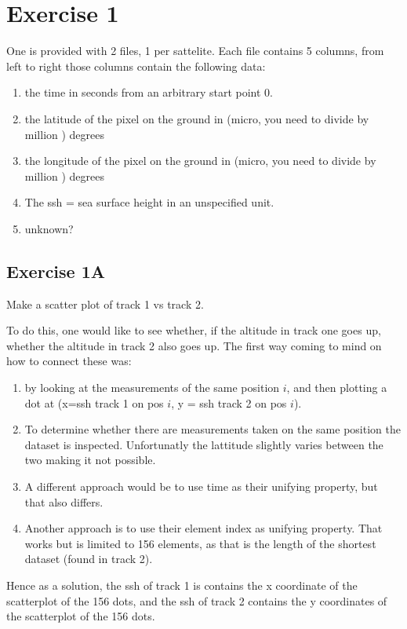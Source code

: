 \section{Exercise 1}\label{sec:exercises}
One is provided with 2 files, 1 per sattelite. Each file contains 5 columns, from left to right those columns contain the following data:
\begin{enumerate}
    \item the time in seconds from an arbitrary start point 0.
    \item the latitude of the pixel on the ground in (micro, you need to divide by million ) degrees
    \item the longitude of the pixel on the ground in (micro, you need to divide by million ) degrees
    \item The ssh = sea surface height in an unspecified unit.
    \item unknown?
\end{enumerate}

\subsection{Exercise 1A}
Make a scatter plot of track 1 vs track 2.

To do this, one would like to see whether, if the altitude in track one goes up, whether the altitude in track 2 also goes up. The first way coming to mind on how to connect these was:
\begin{enumerate}
    \item by looking at the measurements of the same position $i$, and then plotting a dot at (x=ssh track 1 on pos $i$, y = ssh track 2 on pos $i$). 
    \item To determine whether there are measurements taken on the same position the dataset is inspected. Unfortunatly the lattitude slightly varies between the two making it not possible.
    \item A different approach would be to use time as their unifying property, but that also differs.
    \item Another approach is to use their element index as unifying property. That works but is limited to 156 elements, as that is the length of the shortest dataset (found in track 2).
\end{enumerate}
Hence as a solution, the ssh of track 1 is contains the x coordinate of the scatterplot of the 156 dots, and the ssh of track 2 contains the y coordinates of the scatterplot of the 156 dots.

